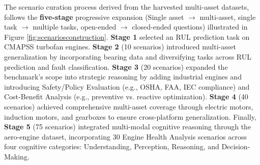 \documentclass[sigconf, screen, nonacm]{acmart}
\begin{document}

The scenario curation process derived from the harvested multi-asset datasets, follows the \textbf{five-stage} progressive expansion (Single asset $\rightarrow$ multi-asset, single task $\rightarrow$ multiple tasks, open-ended $\rightarrow$ closed-ended questions) illustrated in Figure \ref{fig:scenariosconstruction}. \textbf{Stage 1} selected an RUL prediction task on CMAPSS turbofan engines. \textbf{Stage 2} (10 scenarios) introduced multi-asset generalization by incorporating bearing data and diversifying tasks across RUL prediction and fault classification. \textbf{Stage 3} (20 scenarios) expanded the benchmark’s scope into strategic reasoning by adding industrial engines and introducing Safety/Policy Evaluation (e.g., OSHA, FAA, IEC compliance) and Cost-Benefit Analysis (e.g., preventive vs. reactive optimization). \textbf{Stage 4} (40 scenarios) achieved comprehensive multi-asset coverage through electric motors, induction motors, and gearboxes to ensure cross-platform generalization. Finally, \textbf{Stage 5} (75 scenarios) integrated multi-modal cognitive reasoning through the aero-engine dataset, incorporating 30 Engine Health Analysis scenarios across four cognitive categories: Understanding, Perception, Reasoning, and Decision-Making. 


\end{document}
